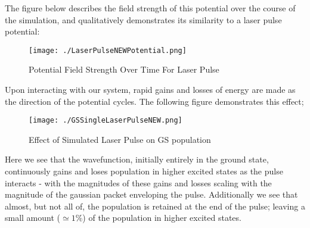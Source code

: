 The figure below describes the field strength of this potential over the course of the simulation, and qualitatively demonstrates its similarity to a laser pulse potential:
\begin{figure}[H]
          \texttt{[image: ./LaserPulseNEWPotential.png]}
          \centering
          \caption{Potential Field Strength Over Time For Laser Pulse}
\end{figure}

Upon interacting with our system, rapid gains and losses of energy are made as the direction of the potential cycles. The following figure demonstrates this effect;
\begin{figure}[H]
          \texttt{[image: ./GSSingleLaserPulseNEW.png]}
          \centering
          \caption{Effect of Simulated Laser Pulse on GS population}
\end{figure}

Here we see that the wavefunction, initially entirely in the ground state, continuously gains and loses population in higher excited states as the pulse interacts - with the magnitudes of these gains and losses scaling with the magnitude of the gaussian packet enveloping the pulse. Additionally we see that almost, but not all of, the population is retained at the end of the pulse; leaving a small amount ($\simeq 1\%$) of the population in higher excited states.

